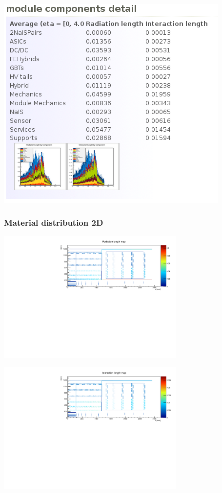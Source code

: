 \documentclass[pdftex, 11pt]{beamer}
\begin{document}
\begin{frame}
  \begin{center}
    \includegraphics[width=\textwidth-2.5cm]{img/screenshot5.png}
  \end{center}
\end{frame}

\begin{frame}
\frametitle{Material distribution 2D}
  \begin{center}
    \includegraphics[width=0.70\textwidth]{img/matDist2d.pdf}
  \end{center}
  \begin{center}
    \includegraphics[width=0.70\textwidth]{img/matDist2d-2.pdf}
  \end{center}
\end{frame}
\end{document}
